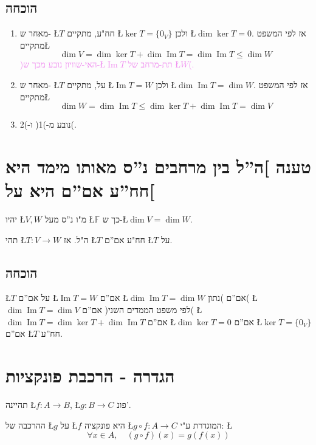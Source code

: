 \documentclass[english,hebrew]{article}
\begin{document}
\subsection{הוכחה}
\begin{enumerate}
\item מאחר ש- \L{$T$} חח"ע, מתקיים \L{$\ker T=\{0_{V}\}$} ולכן \L{$\dim\ker T=0$}.
אז לפי המשפט מתקיים\L{%
\[
\dim V=\dim\ker T+\dim\operatorname{Im}T=\dim\operatorname{Im}T\le\dim W
\]
}%
\textcolor{violet}{)האי-שוויון נובע מכך ש-\L{$\operatorname{Im}T$}
תת-מרחב של \L{$W$}(.}
\item מאחר ש- \L{$T$} על, מתקיים \L{$\operatorname{Im}T=W$} ולכן \L{$\dim\operatorname{Im}T=\dim W$}.
אז לפי המשפט מתקיים\L{%
\[
\dim W=\dim\operatorname{Im}T\le\dim\ker T+\dim\operatorname{Im}T=\dim V
\]
}%
\item נובע מ-)1( ו-)2(. 
\end{enumerate}

\section{טענה {]}ה\textquotedblright ל בין מרחבים נ\textquotedblright ס מאותו
מימד היא חח\textquotedblright ע אם\textquotedblright ם היא על{[}}

יהיו \L{$V,W$} מ"ו נ\textquotedblright ס מעל \L{$\mathbb{F}$} כך
ש-\L{$\dim V=\dim W$}.

תהי \L{$T:V\to W$} ה"ל. אז \L{$T$} חח"ע אם\textquotedblright ם
\L{$T$} על.

\subsection{הוכחה}

\L{$T$} על אם\textquotedblright ם \L{$\operatorname{Im}T=W$} אם\textquotedblright ם
\L{$\dim\operatorname{Im}T=\dim W$} אם\textquotedblright ם )נתון(
\L{$\dim\operatorname{Im}T=\dim V$} אם\textquotedblright ם )לפי משפט
הממדים השני( \L{$\dim\operatorname{Im}T=\dim\ker T+\dim\operatorname{Im}T$}
אם\textquotedblright ם \L{$\dim\ker T=0$} אם\textquotedblright ם
\L{$\ker T=\{0_{V}\}$} אם\textquotedblright ם \L{$T$} חח\textquotedblright ע.

\section{הגדרה - הרכבת פונקציות}

תהיינה \L{$f:A\to B$}, \L{$g:B\to C$} פונ'.

ההרכבה של \L{$g$} על \L{$f$} היא פונקציה \L{$g\circ f:A\to C$}
המוגדרת ע"י: \L{%
\[
\forall x\in A,\quad(g\circ f)(x)=g(f(x))
\]
}%
\end{document}
